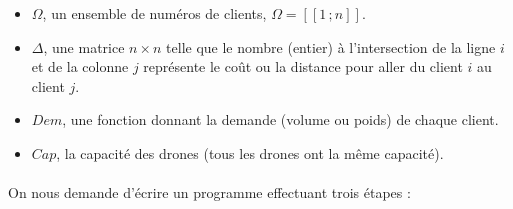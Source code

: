 \documentclass[a4paper,10pt]{article}
\newcommand{\segm}[1]{[\![1\,;#1]\!]}
\begin{document}
\begin{itemize}

\item $\Omega$, un ensemble de numéros de clients, $\Omega = \segm{n}$. 

\item $\Delta$, une matrice $n\times n$ telle que le nombre (entier) à l'intersection de la ligne $i$ et de la colonne $j$ représente le coût ou la distance pour aller du client $i$ au client $j$.

\item $Dem$, une fonction donnant la demande (volume ou poids) de chaque client.

\item $Cap$, la capacité des drones (tous les drones ont la même capacité).

\end{itemize}

\paragraph{}
On nous demande d'écrire un programme effectuant trois étapes :
\end{document}
